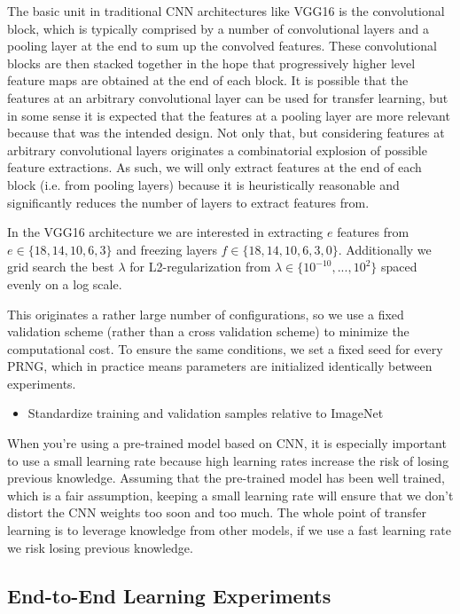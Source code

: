 The basic unit in traditional \ac{CNN} architectures like VGG16 is the convolutional block, which is typically comprised by a number of convolutional layers and a pooling layer at the end to sum up the convolved features. These convolutional blocks are then stacked together in the hope that progressively higher level feature maps are obtained at the end of each block. It is possible that the features at an arbitrary convolutional layer can be used for transfer learning, but in some sense it is expected that the features at a pooling layer are more relevant because that was the intended design. Not only that, but considering features at arbitrary convolutional layers originates a combinatorial explosion of possible feature extractions. As such, we will only extract features at the end of each block (i.e. from pooling layers) because it is heuristically reasonable and significantly reduces the number of layers to extract features from.

In the VGG16 architecture we are interested in extracting $e$ features from $e \in \{18,14,10,6,3\}$ and freezing layers $f \in \{18,14,10,6,3,0\}$. Additionally we grid search the best $\lambda$ for L2-regularization from $\lambda \in \{10^{-10}, ..., 10^{2}\}$ spaced evenly on a log scale.

This originates a rather large number of configurations, so we use a fixed validation scheme (rather than a cross validation scheme) to minimize the computational cost. To ensure the same conditions, we set a fixed seed for every \ac{PRNG}, which in practice means parameters are initialized identically between experiments.

\begin{itemize}
    \item Standardize training and validation samples relative to ImageNet
\end{itemize}

When you're using a pre-trained model based on \ac{CNN}, it is especially important to use a small learning rate because high learning rates increase the risk of losing previous knowledge. Assuming that the pre-trained model has been well trained, which is a fair assumption, keeping a small learning rate will ensure that we don't distort the CNN weights too soon and too much. The whole point of transfer learning is to leverage knowledge from other models, if we use a fast learning rate we risk losing previous knowledge.

\subsection{End-to-End Learning Experiments}

